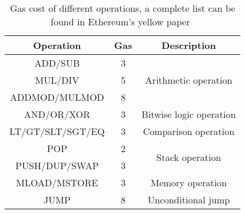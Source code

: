 \begin{table}[ht!]
	\centering
	\vspace*{-1ex}
	\scriptsize
	\caption{Gas cost of different operations, a complete list can be found in Ethereum's yellow paper~\cite{gas}}
	\vspace{-1ex}
	\label{t_gas}
	\begin{tabular}{|c|c|c|}
		\hline
		\textbf{Operation}        & \textbf{Gas}                                                   & \textbf{Description}                                                                           \\ \hline
		\textsc{ADD/SUB}          & 3                                                     & \multirow{3}{*}{Arithmetic operation}                                                           \\ \cline{1-2}
		\textsc{MUL/DIV}          & 5                                                     &                                                                                       \\ \cline{1-2}
		\textsc{ADDMOD/MULMOD}    & 8                                                     &                                                                                       \\ \hline
		\textsc{AND/OR/XOR}       & 3                                                     & Bitwise logic operation                                                                             \\ \hline
		\textsc{LT/GT/SLT/SGT/EQ} & 3                                                     & Comparison operation                                                                            \\ \hline
		\textsc{POP}              & 2                                                     & \multirow{2}{*}{Stack operation}                                                                \\ \cline{1-2}
		\textsc{PUSH/DUP/SWAP}    & 3                                                     &                                                                                       \\ \hline
		\textsc{MLOAD/MSTORE}     & 3                                                     & Memory operation                                                                                \\ \hline
		\textsc{JUMP}             & 8                                                     & Unconditional jump                          \\ \hline

\end{tabular}
\end{table}
